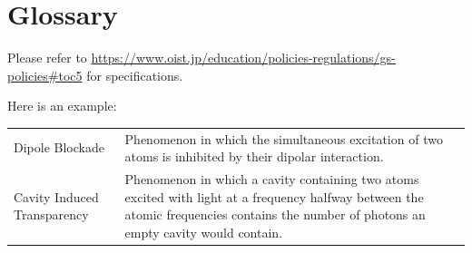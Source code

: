 \chapter*{Glossary}

Please refer to \url{https://www.oist.jp/education/policies-regulations/gs-policies#toc5} for specifications.

Here is an example:

\setlength\LTleft{-5pt} %

\begin{longtable}{l p{}}
    Dipole Blockade             & Phenomenon in which the simultaneous excitation of two atoms is inhibited by their dipolar interaction.                                                                                  \\
    Cavity Induced Transparency & Phenomenon in which a cavity containing two atoms excited with light at a frequency halfway between the atomic frequencies contains the number of photons an empty cavity would contain. \\
\end{longtable}
